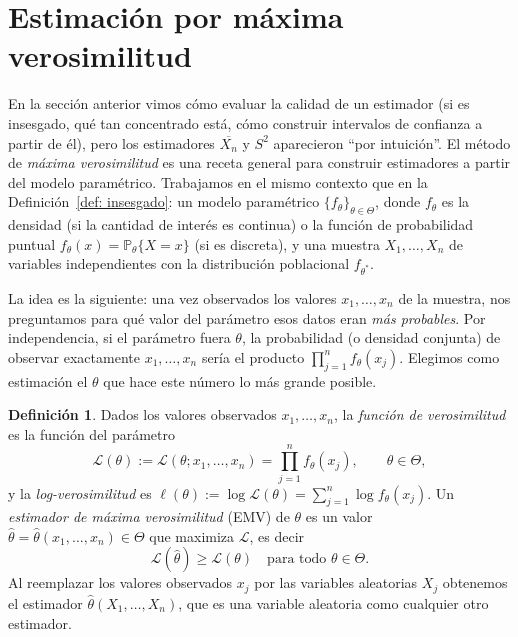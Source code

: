 \documentclass[12pt]{amsart}
\theoremstyle{definition}
\newtheorem{definition}[lemma]{Definición}
\renewcommand{\geq}{\geqslant}
\newcommand{\PP}{\ensuremath{\mathbb{P}}}
\newcommand{\calL}{\ensuremath{\mathcal{L}}}
\begin{document}
\section{Estimación por máxima verosimilitud}

En la sección anterior vimos cómo evaluar la calidad de un estimador (si es insesgado, qué tan concentrado está, cómo construir intervalos de confianza a partir de él), pero los estimadores $\overline{X_n}$ y $S^2$ aparecieron ``por intuición''. El método de \emph{máxima verosimilitud} es una receta general para construir estimadores a partir del modelo paramétrico. Trabajamos en el mismo contexto que en la Definición~\ref{def: insesgado}: un modelo paramétrico $\{f_\theta\}_{\theta\in\Theta}$, donde $f_\theta$ es la densidad (si la cantidad de interés es continua) o la función de probabilidad puntual $f_\theta(x)=\PP_\theta\{X=x\}$ (si es discreta), y una muestra $X_1,\dots,X_n$ de variables independientes con la distribución poblacional $f_{\theta^*}$.

La idea es la siguiente: una vez observados los valores $x_1,\dots,x_n$ de la muestra, nos preguntamos para qué valor del parámetro esos datos eran \emph{más probables}. Por independencia, si el parámetro fuera $\theta$, la probabilidad (o densidad conjunta) de observar exactamente $x_1,\dots,x_n$ sería el producto $\prod_{j=1}^n f_\theta(x_j)$. Elegimos como estimación el $\theta$ que hace este número lo más grande posible.

\begin{definition} \label{def: verosimilitud} Dados los valores observados $x_1,\dots,x_n$, la \emph{función de verosimilitud} es la función del parámetro
    \[\calL(\theta):=\calL(\theta;x_1,\dots,x_n)=\prod_{j=1}^n f_\theta(x_j),\qquad \theta\in\Theta,\]
y la \emph{log-verosimilitud} es $\ell(\theta):=\log \calL(\theta)=\sum_{j=1}^n \log f_\theta(x_j)$. Un \emph{estimador de máxima verosimilitud} (EMV) de $\theta$ es un valor $\widehat{\theta}=\widehat{\theta}(x_1,\dots,x_n)\in\Theta$ que maximiza $\calL$, es decir
    \[\calL(\widehat{\theta})\geq \calL(\theta)\quad\text{para todo }\theta\in\Theta.\]
Al reemplazar los valores observados $x_j$ por las variables aleatorias $X_j$ obtenemos el estimador $\widehat{\theta}(X_1,\dots,X_n)$, que es una variable aleatoria como cualquier otro estimador.
\end{definition}
\end{document}
